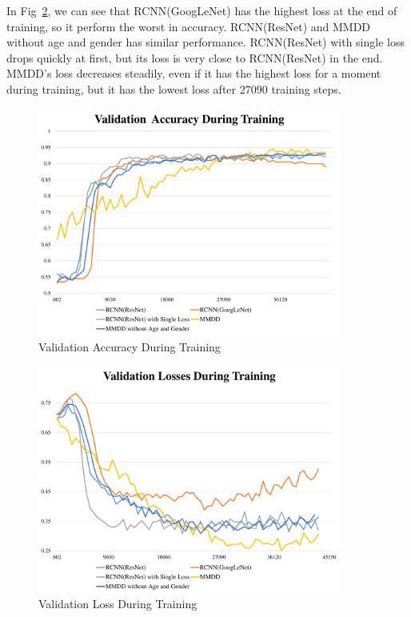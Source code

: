 \documentclass[runningheads]{llncs}
\begin{document}
In Fig~\ref{loss}, we can see that RCNN(GoogLeNet) has the highest loss at the end of training, so it perform the worst in accuracy. RCNN(ResNet) and MMDD without age and gender has similar performance. RCNN(ResNet) with single loss drops quickly at first, but its loss is very close to RCNN(ResNet) in the end. MMDD's loss decreases steadily, even if it has the highest loss for a moment during training, but it has the lowest loss after 27090 training steps. 

\begin{figure}[t]
    \centerline{\includegraphics[width=100mm]{aac.pdf}}
    \vspace{-0cm}
    \caption{Validation Accuracy During Training}
    \vspace{-0cm}
    \label{aac}
    \end{figure}

\begin{figure}[t]
    \centerline{\includegraphics[width=100mm]{losses.pdf}}
    \vspace{-0cm}
    \caption{Validation Loss During Training}
    \vspace{-0cm}
    \label{loss}
    \end{figure}
\end{document}
